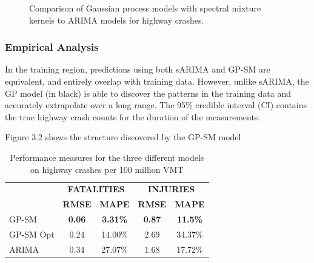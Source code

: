 \documentclass[letterpaper]{article}
\begin{document}
\begin{figure}[t]
{     }
     \hfill
     \caption{Comparison of Gaussian process models with spectral mixture kernels to ARIMA models for highway crashes.}
     \label{fig:gp-posterior}
\end{figure}

\subsubsection{Empirical Analysis}

In the training region, predictions using both sARIMA and GP-SM are equivalent, and entirely overlap with training data. However, unlike sARIMA, the GP model (in black) is able to discover the patterns in the training data and accurately extrapolate over a long range. The 95\% credible interval (CI) contains the true highway crash counts for the duration of the measurements. 

Figure 3.2 shows the structure discovered by the GP-SM model
\lipsum[1-1]

\begin{table}[h]
\caption{Performance measures for the three different models on highway crashes per 100 million VMT}
\label{tab:descriptive-stats-emails}
\begin{center}
\begin{tabular}{l@{\quad}cc@{\quad}cc}
  \toprule
  \multirow{2}{*}{\raisebox{-\heavyrulewidth}{\bf MODEL}} & \multicolumn{2}{c}{\bf FATALITIES} & \multicolumn{2}{c}{\bf INJURIES} \\
  \cmidrule{2-5}
  & {\bf RMSE} & {\bf MAPE} & {\bf RMSE} & {\bf MAPE} \\
  \midrule
  GP-SM & {\bf 0.06} & {\bf 3.31\%} & {\bf 0.87} & {\bf 11.5\%}  \\
  GP-SM Opt & 0.24 & 14.00\% & 2.69 & 34.37\%  \\
  ARIMA & 0.34 & 27.07\% & 1.68 & 17.72\%  \\
  \bottomrule
\end{tabular}
\end{center}
\end{table}
\end{document}

